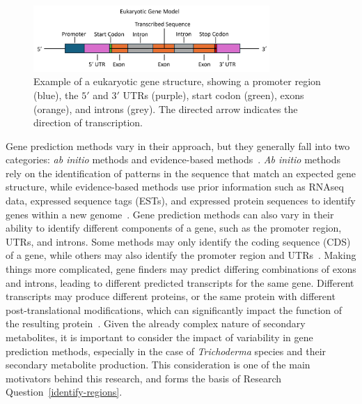 \begin{figure}[ht]
    \centering
    \includegraphics[width=0.8\textwidth]{figures/gene-model-fig-msc.png}
    \caption{Example of a eukaryotic gene structure, showing a promoter region (blue), the $5'$ and $3'$ UTRs (purple), start codon (green), exons (orange), and introns (grey). The directed arrow indicates the direction of transcription. }
    \label{fig:gene-structure}
\end{figure}

Gene prediction methods vary in their approach, but they generally fall into two categories: \textit{ab initio} methods and evidence-based methods~\cite{ejigu2020a}. \textit{Ab initio} methods rely on the identification of patterns in the sequence that match an expected gene structure, while evidence-based methods use prior information such as RNAseq data, expressed sequence tags (ESTs), and expressed protein sequences to identify genes within a new genome~\cite{ejigu2020a}. Gene prediction methods can also vary in their ability to identify different components of a gene, such as the promoter region, UTRs, and introns. Some methods may only identify the coding sequence (CDS) of a gene, while others may also identify the promoter region and UTRs~\cite{ejigu2020a}. Making things more complicated, gene finders may predict differing combinations of exons and introns, leading to different predicted transcripts for the same gene. Different transcripts may produce different proteins, or the same protein with different post-translational modifications, which can significantly impact the function of the resulting protein~\cite{ejigu2020a}. Given the already complex nature of secondary metabolites, it is important to consider the impact of variability in gene prediction methods, especially in the case of \textit{Trichoderma} species and their secondary metabolite production. This consideration is one of the main motivators behind this research, and forms the basis of Research Question~\ref{identify-regions}.

